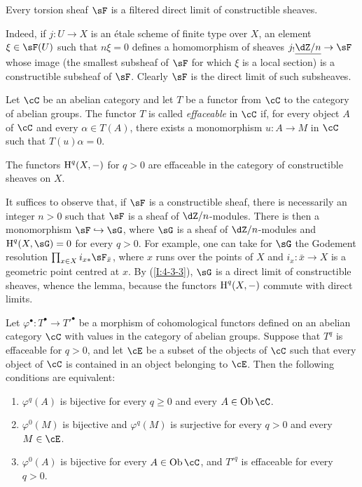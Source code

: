 \begin{lemma}\label{I:4-3-3}
Every torsion sheaf $\sF$ is a filtered direct limit of constructible
sheaves.
\end{lemma}

Indeed, if $j:U\to X$ is an étale scheme of finite type over $X$, an
element $\xi\in\sF(U)$ such that $n\xi=0$ defines a homomorphism of
sheaves $j_!\const{\dZ/n}\to\sF$ whose image (the smallest subsheaf of
$\sF$ for which $\xi$ is a local section) is a constructible subsheaf
of $\sF$. Clearly $\sF$ is the direct limit of such subsheaves.

\begin{definition}\label{I:4-3-4}
Let $\cC$ be an abelian category and let $T$ be a functor from $\cC$ to
the category of abelian groups. The functor $T$ is called
\emph{effaceable} in $\cC$ if, for every object $A$ of $\cC$ and every
$\alpha\in T(A)$, there exists a monomorphism $u:A\to M$ in $\cC$ such
that $T(u)\alpha=0$.
\end{definition}

\begin{lemma}\label{I:4-3-5}
The functors $\operatorname{H}^q(X,-)$ for $q>0$ are effaceable in the category of
constructible sheaves on $X$.
\end{lemma}

It suffices to observe that, if $\sF$ is a constructible sheaf, there is
necessarily an integer $n>0$ such that $\sF$ is a sheaf of
$\dZ/n$-modules. There is then a monomorphism $\sF\hookrightarrow\sG$,
where $\sG$ is a sheaf of $\dZ/n$-modules and
$\h^q(X,\sG)=0$ for every $q>0$. For example, one can take for $\sG$
the Godement resolution $\prod_{x\in X}i_{x*}\sF_{\bar x}$, where $x$
runs over the points of $X$ and $i_x:\bar x\to X$ is a geometric point
centred at $x$. By (\ref{I:4-3-3}), $\sG$ is a direct limit of
constructible sheaves, whence the lemma, because the functors
$\operatorname{H}^q(X,-)$ commute with direct limits.

\begin{lemma}\label{I:4-3-6}
Let $\varphi^\bullet:T^\bullet\to{T'}^\bullet$ be a morphism of
cohomological functors defined on an abelian category $\cC$ with values
in the category of abelian groups. Suppose that $T^q$ is effaceable for
$q>0$, and let $\cE$ be a subset of the objects of $\cC$ such that
every object of $\cC$ is contained in an object belonging to $\cE$.
Then the following conditions are equivalent:
\begin{enumerate}[\indent (i)]
  \item $\varphi^q(A)$ is bijective for every $q\geqslant0$ and every
    $A\in\ob\cC$.
  \item $\varphi^0(M)$ is bijective and $\varphi^q(M)$ is surjective for
    every $q>0$ and every $M\in\cE$.
  \item $\varphi^0(A)$ is bijective for every $A\in\ob\cC$, and
    ${T'}^q$ is effaceable for every $q>0$.
\end{enumerate}
\end{lemma}

